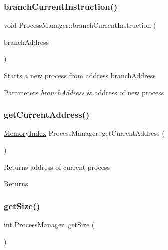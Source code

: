 \subsubsection{\texorpdfstring{branch\+Current\+Instruction()}{branchCurrentInstruction()}}
{\footnotesize\ttfamily void Process\+Manager\+::branch\+Current\+Instruction (\begin{DoxyParamCaption}\item[{\hyperlink{classMemoryIndex}{Memory\+Index}}]{branch\+Address }\end{DoxyParamCaption})}

Starts a new process from address branch\+Address 
\begin{DoxyParams}{Parameters}
{\em branch\+Address} & address of new process \\
\hline
\end{DoxyParams}
\mbox{\label{classProcessManager_abfb4edde7c0650b0bfc457a5be28d514}} 
\subsubsection{\texorpdfstring{get\+Current\+Address()}{getCurrentAddress()}}
{\footnotesize\ttfamily \hyperlink{classMemoryIndex}{Memory\+Index} Process\+Manager\+::get\+Current\+Address (\begin{DoxyParamCaption}{ }\end{DoxyParamCaption})}

Returns address of current process \begin{DoxyReturn}{Returns}

\end{DoxyReturn}
\mbox{\label{classProcessManager_a20de7626ee3409fb05c0b53a32697bae}} 
\subsubsection{\texorpdfstring{get\+Size()}{getSize()}}
{\footnotesize\ttfamily int Process\+Manager\+::get\+Size (\begin{DoxyParamCaption}{ }\end{DoxyParamCaption})}

